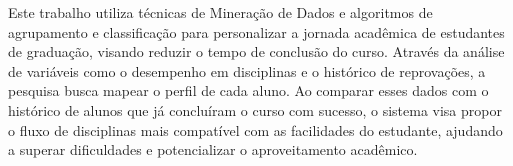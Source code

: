 Este trabalho utiliza técnicas de Mineração de Dados e algoritmos de agrupamento e classificação para personalizar a jornada acadêmica de estudantes de graduação, visando reduzir o tempo de conclusão do curso. Através da análise de variáveis como o desempenho em disciplinas e o histórico de reprovações, a pesquisa busca mapear o perfil de cada aluno. Ao comparar esses dados com o histórico de alunos que já concluíram o curso com sucesso, o sistema visa propor o fluxo de disciplinas mais compatível com as facilidades do estudante, ajudando a superar dificuldades e potencializar o aproveitamento acadêmico.
